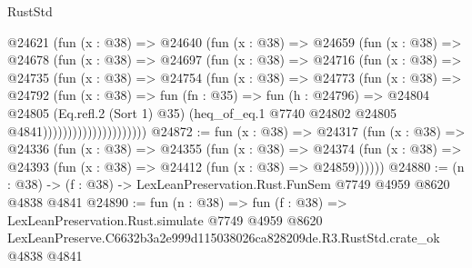 \begin{lexlean}{RustStd}
\begin{coremodule}
                      @24621
                        (fun (x : @38) =>
                        @24640
                          (fun (x : @38) =>
                          @24659
                            (fun (x : @38) =>
                            @24678
                              (fun (x : @38) =>
                              @24697
                                (fun (x : @38) =>
                                @24716
                                  (fun (x : @38) =>
                                  @24735
                                    (fun (x : @38) =>
                                    @24754
                                      (fun (x : @38) =>
                                      @24773
                                        (fun (x : @38) =>
                                        @24792
                                          (fun (x : @38) =>
                                          fun (fn : @35) =>
                                          fun (h : @24796) =>
                                          @24804
                                            @24805
                                            (Eq.refl.{2} (Sort 1) @35)
                                            (heq_of_eq.{1}
                                              @7740
                                              @24802
                                              @24805
                                              @4841)))))))))))))))))))))
@24872 := fun (x : @38) =>
  @24317
    (fun (x : @38) =>
    @24336
      (fun (x : @38) =>
      @24355
        (fun (x : @38) =>
        @24374 (fun (x : @38) => @24393 (fun (x : @38) => @24412 (fun (x : @38) => @24859))))))
@24880 := (n : @38) -> (f : @38) -> LexLeanPreservation.Rust.FunSem @7749 @4959 @8620 @4838 @4841
@24890 := fun (n : @38) =>
  fun (f : @38) =>
  LexLeanPreservation.Rust.simulate
    @7749
    @4959
    @8620
    LexLeanPreserve.C6632b3a2e999d115038026ca828209de.R3.RustStd.crate_ok
    @4838
    @4841
\end{coremodule}
\end{lexlean}
